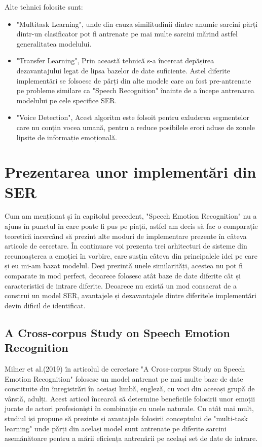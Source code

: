 \documentclass[a4paper,12pt]{book}
\begin{document}
						Alte tehnici folosite sunt: 
						\begin{itemize}
							\setlength\topsep{0pt}
							\setlength\itemsep{0pt}
							\setlength{\itemindent}{1cm}
							\item "Multitask Learning", unde din cauza similitudinii dintre anumie sarcini părți dintr-un clasificator pot fi antrenate pe mai multe sarcini mărind astfel generalitatea modelului.
							\item "Transfer Learning", Prin această tehnică s-a încercat depășirea dezavantajului legat de lipsa bazelor de date suficiente. Astel diferite implementări se folsoesc de părți din alte modele care au fost pre-antrenate pe probleme similare ca "Speech Recognition" înainte de a începe antrenarea modelului pe cele specifice SER.
							\item "Voice Detection", Acest algoritm este folsoit pentru exluderea segmentelor care nu conțin vocea umană, pentru a reduce posibilele erori aduse de zonele lipsite de informație emoțională. 					
					\end{itemize}
				
				
				\section{Prezentarea unor implementări din SER} \label{papers}
					Cum am menționat și în capitolul precedent, "Speech Emotion Recognition" nu a ajuns în punctul în care poate fi pus pe piață, astfel am decis să fac o comparație teoretică incercând să prezint alte moduri de implementare prezente în câteva articole de cercetare. În continuare voi prezenta trei arhitecturi de sisteme din recunoașterea a emoției în vorbire, care susțin câteva din principalele idei pe care și eu mi-am bazat modelul. Deși prezintă unele similarități, acestea nu pot fi comparate in mod perfect, deoarece folosesc atât baze de date diferite cât și caracteristici de intrare diferite. Deoarece nu există un mod consacrat de a construi un model SER, avantajele și dezavantajele dintre diferitele implementări devin dificil de identificat. \par		
					
					\subsection{A Cross-corpus Study on Speech Emotion Recognition} \label{prez_multi_domain}
					
					
					Milner et al.(2019) în articolul de cercetare "A Cross-corpus Study on Speech Emotion Recognition" \cite{multi-domain} folosesc un model antrenat pe mai multe baze de date constituite din înregistrări în aceiași limbă, engleză, cu voci din aceeași grupă de vârstă, adulți. Acest articol încearcă să determine beneficiile folosirii  unor emoții jucate de actori profesioniști în combinație cu unele naturale. Cu atât mai mult, studiul iși propune să prezinte și avantajele folosirii conceptului de "multi-task learning" unde părți din același model sunt antrenate pe diferite sarcini asemănătoare pentru a mării eficiența antrenării pe același set de date de intrare. \par
					
\end{document}
